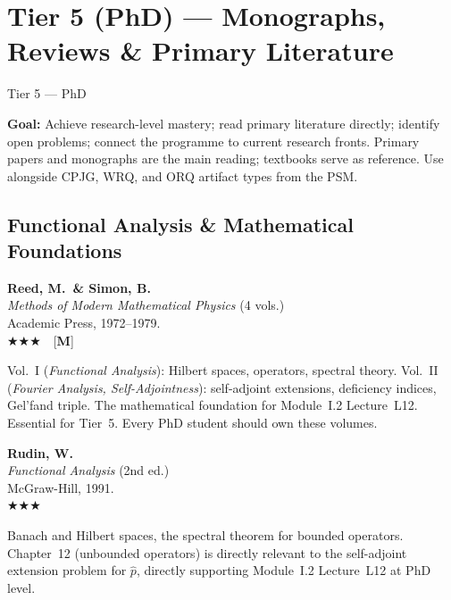 \documentclass[11pt,a4paper]{article}
\newcommand{\essential}{$\bigstar\bigstar\bigstar$}
\newenvironment{bibentry}[1]{%
  \begin{tcolorbox}[entrybox=#1, top=4pt, bottom=4pt]%
}{%
  \end{tcolorbox}\smallskip%
}
\begin{document}
\newpage
\section{Tier 5 (PhD) --- Monographs, Reviews \& Primary Literature}
\label{sec:t5}

\begin{tcolorbox}[tierheader=t5red]
Tier 5 --- PhD
\end{tcolorbox}

\medskip
\begin{tcolorbox}[keybox]
\textbf{Goal:} Achieve research-level mastery; read primary literature directly;
identify open problems; connect the programme to current research fronts.
Primary papers and monographs are the main reading; textbooks serve as reference.
Use alongside CPJG, WRQ, and ORQ artifact types from the PSM.
\end{tcolorbox}

\subsection{Functional Analysis \& Mathematical Foundations}

\begin{bibentry}{t5light}
\textbf{Reed, M.\ \& Simon, B.}\\
\textit{Methods of Modern Mathematical Physics} (4 vols.)\\
Academic Press, 1972--1979.\\[4pt]
\essential\ \ [\textbf{M}]\\[4pt]
\begin{tcolorbox}[annotbox]
Vol.~I (\textit{Functional Analysis}): Hilbert spaces, operators, spectral theory.
Vol.~II (\textit{Fourier Analysis, Self-Adjointness}): self-adjoint extensions,
deficiency indices, Gel'fand triple. The mathematical foundation for Module~I.2
Lecture~L12. Essential for Tier~5. Every PhD student should own these volumes.
\end{tcolorbox}
\end{bibentry}

\begin{bibentry}{t5light}
\textbf{Rudin, W.}\\
\textit{Functional Analysis} (2nd ed.)\\
McGraw-Hill, 1991.\\[4pt]
\essential\\[4pt]
\begin{tcolorbox}[annotbox]
Banach and Hilbert spaces, the spectral theorem for bounded operators. Chapter~12
(unbounded operators) is directly relevant to the self-adjoint extension problem
for $\hat{p}$, directly supporting Module~I.2 Lecture~L12 at PhD level.
\end{tcolorbox}
\end{bibentry}
\end{document}
